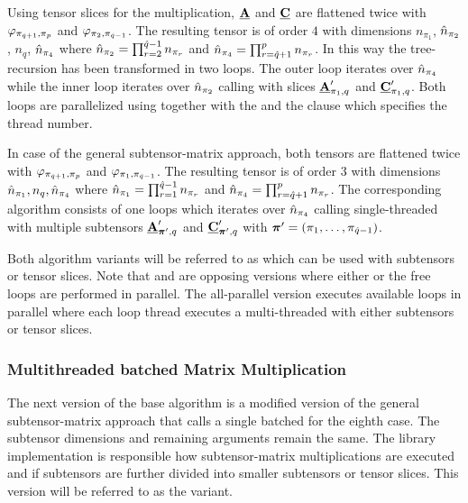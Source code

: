 Using tensor slices for the multiplication, $\underline{\mathbf{A}}$ and $\underline{\mathbf{C}}$ are flattened twice with $\varphi_{\pi_{\hat{q}+1},\pi_p}$ and $\varphi_{\pi_{2},\pi_{\hat{q}-1}}$.
The resulting tensor is of order $4$ with dimensions $n_{\pi_1}$, $\hat{n}_{\pi_2}$, $n_{q}$, $\hat{n}_{\pi_4}$ where $\hat{n}_{\pi_2} = \prod_{r=2}^{\hat{q}-1} n_{\pi_r}$ and $\hat{n}_{\pi_4} = \prod_{r=\hat{q}+1}^{p} n_{\pi_r}$.
In this way the tree-recursion has been transformed in two loops.
The outer loop iterates over $\hat{n}_{\pi_4}$ while the inner loop iterates over $\hat{n}_{\pi_2}$ calling  with slices $\underline{\mathbf{A}}_{\pi_1,q}'$ and $\underline{\mathbf{C}}_{\pi_1,q}'$.
Both loops are parallelized using  together with the  and the  clause which specifies the thread number.


In case of the general subtensor-matrix approach, both tensors are flattened twice with $\varphi_{\pi_{\hat{q}+1},\pi_p}$ and $\varphi_{\pi_{1},\pi_{\hat{q}-1}}$. 
The resulting tensor is of order $3$ with dimensions $\hat{n}_{\pi_1}, n_{q}, \hat{n}_{\pi_4}$ where $\hat{n}_{\pi_1} = \prod_{r=1}^{\hat{q}-1} n_{\pi_r}$ and $\hat{n}_{\pi_4} = \prod_{r=\hat{q}+1}^{p} n_{\pi_r}$.
The corresponding algorithm consists of one loops which iterates over $\hat{n}_{\pi_4}$ calling single-threaded  with multiple subtensors $\underline{\mathbf{A}}_{\boldsymbol{\pi}',q}'$ and $\underline{\mathbf{C}}_{\boldsymbol{\pi}',q}'$ with $\boldsymbol{\pi}' = (\pi_1,\dots,\pi_{\hat{q}-1})$.

Both algorithm variants will be referred to as  which can be used with subtensors or tensor slices.
Note that  and  are opposing versions where either  or the free loops are performed in parallel.
The all-parallel version  executes available loops in parallel where each loop thread executes a multi-threaded  with either subtensors or tensor slices.
\vspace{-1em}

\subsubsection{Multithreaded batched Matrix Multiplication}
The next version of the base algorithm is a modified version of the general subtensor-matrix approach that calls a single batched  for the eighth case.
The subtensor dimensions and remaining  arguments remain the same.
The library implementation is responsible how subtensor-matrix multiplications are executed and if subtensors are further divided into smaller subtensors or tensor slices.
This version will be referred to as the  variant.
